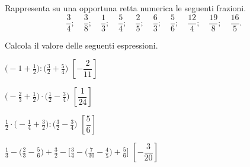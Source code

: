 \begin{comment}
\begin{esercizio}
\label{ese:3.137}
Relativamente alla figura~\ref{fig:3.6}, quale proposizione è vera?

\begin{enumeratea}
\item Il segmento~\(AB\) la divide in due parti uguali;
\item il segmento~\(AB\) la divide in due quadrilateri.
\end{enumeratea}
\end{esercizio}

 \begin{esercizio}
 \label{ese:3.138}
La parte in grigio rappresenta~\(1/4\) della figura~\ref{fig:3.7}?
\end{esercizio}

\begin{esercizio}
\label{ese:3.139}
 Costruisci una figura che sia gli~\(11/6\) della figura~\ref{fig:3.8}.
\end{esercizio}

\begin{esercizio}
\label{ese:3.140}
Colora i~\(3/4\) della figura~\ref{fig:3.9}.
\end{esercizio}

\begin{esercizio}
\label{ese:3.141}
Costruire la frazione~\(\frac{N}{D}\) significa dividere l'unità in \ldots 
parti uguali e prendere \ldots parti.
\end{esercizio}

\end{comment}

\begin{esercizio}
\label{ese:3.142}
Rappresenta su una opportuna retta numerica le seguenti frazioni.
\[\frac{3}{4};\quad\frac{3}{8};\quad\frac{1}{3};\quad\frac{5}{4};\quad
\frac{2}{5};\quad\frac{6}{3};\quad\frac{5}{6};\quad%
\frac{12}{4};\quad\frac{19}{8};\quad\frac{16}{5}.\]
\end{esercizio}

\begin{esercizio}[\Ast]
\label{ese:3.143}
Calcola il valore delle seguenti espressioni.
\begin{enumeratea}
\spazielenx
\item \(\displaystyle{\bigg(-1+\frac{1}{2}\bigg):\bigg(\frac{3}{2}+
\frac{5}{4}\bigg)}\)
  \hfill \(\left[-\dfrac{2}{11} \right]\)
\item \(\displaystyle{\bigg(-{\frac{2}{3}}+\frac{1}{2}\bigg)\cdot
\bigg(\frac{1}{2}-\frac{3}{4}\bigg)}\)
  \hfill \(\left[\dfrac{1}{24} \right]\)
\item \(\displaystyle{\frac{1}{2}\cdot\bigg(-{\frac{1}{4}}+\frac{3}{2}\bigg):
\bigg(\frac{3}{2}-\frac{3}{4}\bigg)}\)
  \hfill \(\left[\dfrac{5}{6} \right]\)
\item \(\displaystyle{\frac{1}{3}-\bigg(\frac{2}{3}-\frac{5}{6}\bigg)+
\frac{3}{2}-\bigg[\frac{3}{4}-\bigg(\frac{7}{30}%
-\frac{4}{5}\bigg)+\frac{5}{6}\bigg]}\)
  \hfill \(\left[-\dfrac{3}{20} \right]\)
\end{enumeratea}
\end{esercizio}

